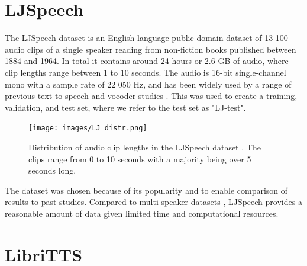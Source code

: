 \documentclass{report}
\begin{document}
\section{LJSpeech}

The LJSpeech dataset \cite{ljspeech17} is an English language public domain dataset of 13 100 audio clips of a single speaker reading from non-fiction books published between 1884 and 1964. In total it contains around 24 hours or 2.6 GB of audio, where clip lengths range between 1 to 10 seconds. The audio is 16-bit single-channel mono with a sample rate of 22 050 Hz, and has been widely used by a range of previous text-to-speech and vocoder studies \cite{tan2021survey, kong2020diffwave, lee2021priorgrad}. This was used to create a training, validation, and test set, where we refer to the test set as "LJ-test".

\begin{figure}[H]
    \centering
    \texttt{[image: images/LJ\_distr.png]}
    \caption{\onehalfspacing Distribution of audio clip lengths in the LJSpeech dataset \cite{ljspeech17}. The clips range from 0 to 10 seconds with a majority being over 5 seconds long.}
    \label{fig:my_label}
\end{figure}
The dataset was chosen because of its popularity and to enable comparison of results to past studies. Compared to multi-speaker datasets \cite{panayotov2015librispeech, zen2019libritts, ardila2019common}, LJSpeech provides a reasonable amount of data given limited time and computational resources.



\section{LibriTTS}
\end{document}
